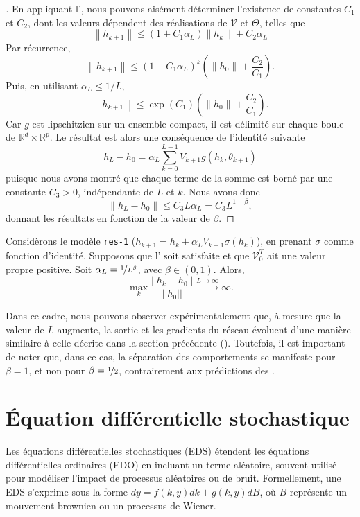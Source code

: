\begin{proof}[]
    En appliquant l', nous pouvons aisément déterminer l'existence de constantes $C_1$ et $C_2$, dont les valeurs dépendent des réalisations de $\mathscr{V}$ et $\Theta$, telles que
    $$
        \left\|h_{k+1}\right\| \leqslant\left(1+C_1 \alpha_L\right)\left\|h_k\right\|+C_2 \alpha_L
    $$
    Par récurrence,
    $$
        \left\|h_{k+1}\right\| \leqslant\left(1+C_1 \alpha_L\right)^k\left(\left\|h_0\right\|+\frac{C_2}{C_1}\right) .
    $$
    Puis, en utilisant $\alpha_L \leqslant 1 / L$,
    $$
        \left\|h_{k+1}\right\| \leqslant \exp \left(C_1\right)\left(\left\|h_0\right\|+\frac{C_2}{C_1}\right) .
    $$
    Car $g$ est lipschitzien sur un ensemble compact, il est délimité sur chaque boule de $\mathbb{R}^d \times \mathbb{R}^p$. Le résultat est alors une conséquence de l'identité suivante
    $$
        h_L-h_0=\alpha_L \sum_{k=0}^{L-1} V_{k+1} g\left(h_k, \theta_{k+1}\right)
    $$
    puisque nous avons montré que chaque terme de la somme est borné par une constante $C_3>0$, indépendante de $L$ et $k$. Nous avons donc 
    $$
        \left\|h_L-h_0\right\| \leqslant C_3 L \alpha_L=C_3 L^{1-\beta},
    $$
    donnant les résultats en fonction de la valeur de $\beta$.
\end{proof}

\begin{proposition}\label{prop13}
    Considèrons le modèle \texttt{res-1} ($h_{k+1} = h_k +\alpha_{L}V_{k+1}\sigma(h_k) $), en prenant $\sigma$ comme fonction d'identité. Supposons que l' soit satisfaite et que $\mathscr{V} _0 ^T$ ait une valeur propre positive. Soit $\alpha_L = \nicefrac{1}{L^{\beta}}$, avec $\beta \in (0,1)$. Alors, 
    \[
        \max_{k}\frac{||h_k-h_0||}{||h_0||} \xrightarrow{L \to \infty } \infty
    .\]
\end{proposition}
Dans ce cadre, nous pouvons observer expérimentalement que, à mesure que la valeur de $L$ augmente, la sortie et les gradients du réseau évoluent d'une manière similaire à celle décrite dans la section précédente (). Toutefois, il est important de noter que, dans ce cas, la séparation des comportements se manifeste pour $\beta = 1$, et non pour $\beta = \nicefrac{1}{2}$, contrairement aux prédictions des .

\section{Équation différentielle stochastique}
Les équations différentielles stochastiques (EDS) étendent les équations différentielles ordinaires (EDO) en incluant un terme aléatoire, souvent utilisé pour modéliser l'impact de processus aléatoires ou de bruit. Formellement, une EDS s'exprime sous la forme $dy = f(k,y)dk + g(k,y)dB$, où $B$ représente un mouvement brownien ou un processus de Wiener.

